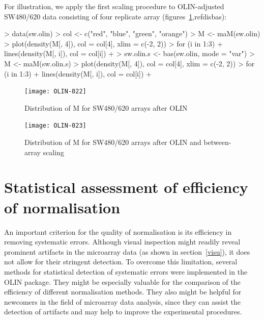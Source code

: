 \documentclass[a4paper,11pt]{article}
\begin{document}
For illustration, we apply the first scaling procedure to  OLIN-adjusted SW480/620 data consisting of four
replicate array (figures~\ref{disolin},ref{disbas}):

 
\begin{Schunk}
\begin{Sinput}
> data(sw.olin)
> col <- c("red", "blue", "green", "orange")
> M <- maM(sw.olin)
> plot(density(M[, 4]), col = col[4], xlim = c(-2, 2))
> for (i in 1:3) {
+     lines(density(M[, i]), col = col[i])
+ }
> sw.olin.s <- bas(sw.olin, mode = "var")
> M <- maM(sw.olin.s)
> plot(density(M[, 4]), col = col[4], xlim = c(-2, 2))
> for (i in 1:3) {
+     lines(density(M[, i]), col = col[i])
+ }
\end{Sinput}
\end{Schunk}



\begin{figure}[t]
\centering
\texttt{[image: OLIN-022]}
\caption{Distribution of M for SW480/620 arrays after OLIN  }
\label{disolin}
\end{figure}


\begin{figure}
\centering
\texttt{[image: OLIN-023]}
\caption{Distribution of M for SW480/620 arrays after OLIN and between-array scaling}
\label{disbas}
\end{figure}




 


\section{Statistical assessment of efficiency of normalisation}
\label{stats}
An important criterion for the quality of normalisation is its efficiency in 
removing systematic errors. Although visual inspection might readily reveal prominent
artifacts in the microarray data (as shown in section~\ref{visu}), it does not allow for their stringent 
detection. To overcome this limitation, several methods for statistical detection of 
systematic errors were implemented in the OLIN package. They might be especially valuable
for the comparison of the efficiency of different normalisation methods. They also might 
be helpful for newcomers in the field of microarray data analysis, since they can assist the
detection of artifacts and may help to improve the experimental procedures.
\end{document}
